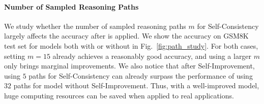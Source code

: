 \paragraph{Number of Sampled Reasoning Paths}
We study whether the number of sampled reasoning paths $m$ for Self-Consistency largely affects the accuracy after \method is applied. We show the accuracy on GSM8K test set for models both with or without \method in Fig.~\ref{fig:path_study}. For both cases, setting $m=15$ already achieves a reasonably good accuracy, and using a larger $m$ only brings marginal improvements. We also notice that after Self-Improvement, using $5$ paths for Self-Consistency can already surpass the performance of using $32$ paths for model without Self-Improvement. Thus, with a well-improved model, huge computing resources can be saved when applied to real applications.

